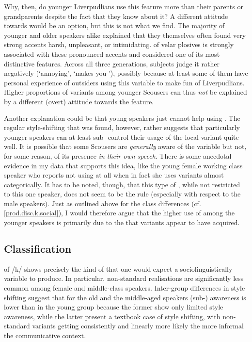 Why, then, do younger Liverpudlians use this feature more than their parents or grandparents despite the fact that they know about it?
A different attitude towards  would be an option, but this is not what we find.
The majority of younger and older speakers alike explained that they themselves often found very strong  accents harsh, unpleasant, or intimidating.
 of velar plosives is strongly associated with these pronounced  accents and considered one of its most distinctive features.
Across all three generations, subjects judge it rather negatively (`annoying', `makes you '), possibly because at least some of them have personal experience of outsiders using this variable to make fun of Liverpudlians.
Higher proportions of  variants among younger Scousers can thus \emph{not} be explained by a different (overt) attitude towards the feature.

Another explanation could be that young speakers just cannot help using .
The regular style-shifting that was found, however, rather suggests that particularly younger speakers can at least sub- control their usage of the local variant quite well.
It is possible that some Scousers are \emph{generally} aware of the variable but not, for some reason, of its presence \emph{in their own speech}.
There is some anecdotal evidence in my data that supports this idea, like the young female working class speaker who reports not using  at all when in fact she uses  variants almost categorically.
It has to be noted, though, that this type of , while not restricted to this one speaker, does not seem to be the rule (especially with respect to the male speakers).
Just as outlined above for the class differences (cf. \ref{prod.disc.k.social}), I would therefore argue that the higher use of  among the younger speakers is primarily due to the   that  variants appear to have acquired.

\subsection{Classification}
\label{prod.disc.k.classification}

 of /k/ shows precisely the kind of  that one would expect a sociolinguistically  variable to produce.
In particular, non-standard realisations are significantly less common among female and middle-class speakers.
Inter-group differences in style shifting suggest that for the old and the middle-aged speakers (sub-) awareness is lower than in the young group because the former show only limited style awareness, while the latter present a textbook case of  style shifting, with non-standard variants getting consistently and linearly more likely the more informal the communicative context.


